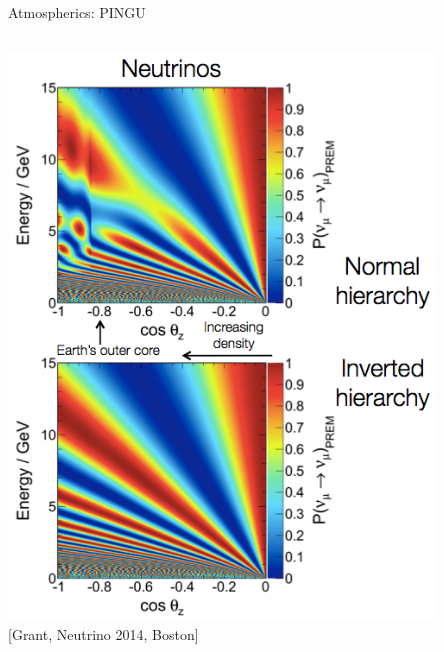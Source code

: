 \begin{frame}{Atmospherics: PINGU}
\begin{columns}
\begin{column}{0.50\textwidth}
    \includegraphics[width=0.85\textwidth]{./images/3nu/atmo/pingu_oscillogram.png}\\
    {\scriptsize {\color{blue}[Grant, Neutrino 2014, Boston]}}\\
  \end{column}
\end{columns}
\end{frame}



